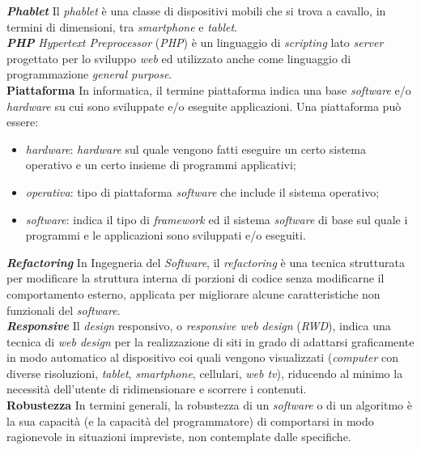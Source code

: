 \textbf{\textit{Phablet}} Il \textit{phablet} è una classe di dispositivi mobili che si trova a cavallo, in termini di dimensioni, tra \textit{smartphone} e \textit{tablet}.\\

\textbf{\textit{PHP}} \textit{Hypertext Preprocessor} (\textit{PHP}) è un linguaggio di \textit{scripting} lato \textit{server} progettato per lo sviluppo \textit{web} ed utilizzato anche come linguaggio di programmazione \textit{general purpose}.\\

\textbf{Piattaforma} In informatica, il termine piattaforma indica una base \textit{software} e/o \textit{hardware} su cui sono sviluppate e/o eseguite applicazioni. Una piattaforma può essere:
\begin{itemize}
	\item \textit{hardware}: \textit{hardware} sul quale vengono fatti eseguire un certo sistema operativo e un certo insieme di programmi applicativi;
	\item \textit{operativa}: tipo di piattaforma \textit{software} che include il sistema operativo;
	\item \textit{software}: indica il tipo di \textit{framework} ed il sistema \textit{software} di base sul quale i programmi e le applicazioni sono sviluppati e/o eseguiti.
\end{itemize}

\textbf{\textit{Refactoring}} In Ingegneria del \textit{Software}, il \textit{refactoring} è una tecnica strutturata per modificare la struttura interna di porzioni di codice senza modificarne il comportamento esterno, applicata per migliorare alcune caratteristiche non funzionali del \textit{software}.\\

\textbf{\textit{Responsive}} Il \textit{design} responsivo, o \textit{responsive web design} (\textit{RWD}), indica una tecnica di \textit{web design} per la realizzazione di siti in grado di adattarsi graficamente in modo automatico al dispositivo coi quali vengono visualizzati (\textit{computer} con diverse risoluzioni, \textit{tablet}, \textit{smartphone}, cellulari, \textit{web tv}), riducendo al minimo la necessità dell'utente di ridimensionare e scorrere i contenuti.\\

\textbf{Robustezza} In termini generali, la robustezza di un \textit{software} o di un algoritmo è la sua capacità (e la capacità del programmatore) di comportarsi in modo ragionevole in situazioni impreviste, non contemplate dalle specifiche.\\

